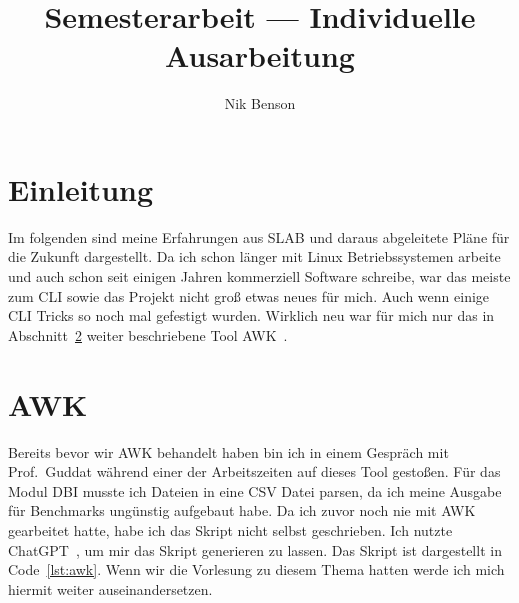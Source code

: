 \documentclass[12pt]{article}
\title{Semesterarbeit --- Individuelle Ausarbeitung}
\author[1]{Nik Benson}
\affil[1]{\href{mailto:nik.benson@studmail.w-hs.de}{nik.benson@studmail.w-hs.de}}
\begin{document}
    

    \setcounter{page}{2}
    \tableofcontents
    \listoffigures
    \listoftables
    \lstlistoflistings
    \newpage

    \section{Einleitung}\label{sec:einleitung}
        Im folgenden sind meine Erfahrungen aus SLAB und daraus abgeleitete Pläne für die Zukunft dargestellt.
        Da ich schon länger mit Linux Betriebssystemen arbeite und auch schon seit einigen Jahren kommerziell Software schreibe, war das meiste zum CLI sowie das Projekt nicht groß etwas neues für mich.
        Auch wenn einige CLI Tricks so noch mal gefestigt wurden.
        Wirklich neu war für mich nur das in Abschnitt~\ref{sec:awk} weiter beschriebene Tool AWK~.


    \section{AWK}\label{sec:awk}
        Bereits bevor wir AWK behandelt haben bin ich in einem Gespräch mit Prof.\ Guddat während einer der Arbeitszeiten auf dieses Tool gestoßen.
        Für das Modul DBI musste ich  Dateien in eine CSV Datei parsen, da ich meine Ausgabe für Benchmarks ungünstig aufgebaut habe.
        Da ich zuvor noch nie mit AWK gearbeitet hatte, habe ich das Skript nicht selbst geschrieben.
        Ich nutzte ChatGPT~\autocite{openai-2023}, um mir das Skript generieren zu lassen.
        Das Skript ist dargestellt in Code~\ref{lst:awk}.
        Wenn wir die Vorlesung zu diesem Thema hatten werde ich mich hiermit weiter auseinandersetzen.
        
\end{document}
